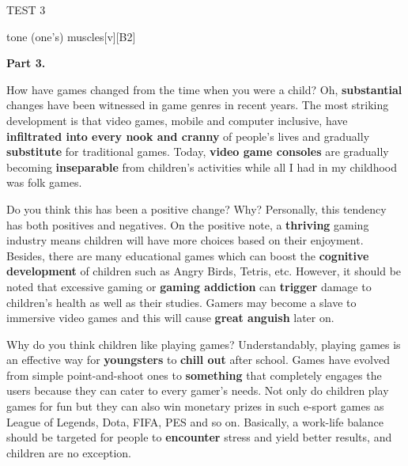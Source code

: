 \begin{glossarymc}[Cambridge 6]
\begin{test}{TEST 3}
\begin{VocabExplain}[Part 2]
            \begin{ExplainCard}{tone (one’s) muscles}[v][B2]
            \end{ExplainCard}
        \end{VocabExplain}

    \noindent
    \textbf{Part 3.}
    \begin{qa}{How have games changed from the time when you were a child?}
    Oh, \textbf{substantial} changes have been witnessed in game genres in recent years. The most striking development is that video games, mobile and computer inclusive, have \textbf{infiltrated into every nook and cranny} of people's lives and gradually \textbf{substitute} for traditional games. Today, \textbf{video game consoles} are gradually becoming \textbf{inseparable} from children's activities while all I had in my childhood was folk games.
    \end{qa}

    \begin{qa}{Do you think this has been a positive change? Why?}
    Personally, this tendency has both positives and negatives. On the positive note, a \textbf{thriving} gaming industry means children will have more choices based on their enjoyment. Besides, there are many educational games which can boost the \textbf{cognitive development} of children such as Angry Birds, Tetris, etc. However, it should be noted that excessive gaming or \textbf{gaming addiction} can \textbf{trigger} damage to children's health as well as their studies. Gamers may become a slave to immersive video games and this will cause \textbf{great anguish} later on.
    \end{qa}

    \begin{qa}{Why do you think children like playing games?}
    Understandably, playing games is an effective way for \textbf{youngsters} to \textbf{chill out} after school. Games have evolved from simple point-and-shoot ones to \textbf{something} that completely engages the users because they can cater to every gamer's needs. Not only do children play games for fun but they can also win monetary prizes in such e-sport games as League of Legends, Dota, FIFA, PES and so on. Basically, a work-life balance should be targeted for people to \textbf{encounter} stress and yield better results, and children are no exception.
    \end{qa}


\end{test}
\end{glossarymc}
